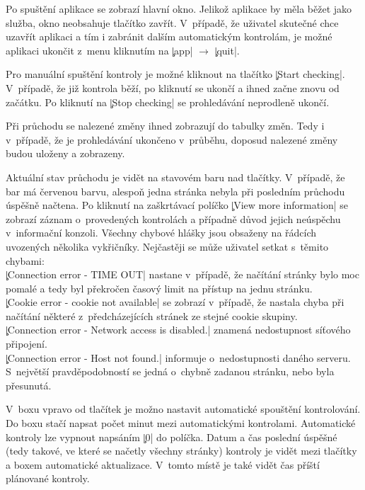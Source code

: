 Po spuštění aplikace se zobrazí hlavní okno.
Jelikož aplikace by měla běžet jako služba, okno neobsahuje tlačítko zavřít.
V~případě, že uživatel skutečné chce uzavřít aplikaci a tím i zabránit dalším automatickým kontrolám, je možné aplikaci ukončit z~menu kliknutím na \c|app| $\rightarrow$ \c|quit|.

Pro manuální spuštění kontroly je možné kliknout na tlačítko \c|Start checking|.
V~případě, že již kontrola běží, po kliknutí se ukončí a ihned začne znovu od začátku.
Po kliknutí na \c|Stop checking| se prohledávání neprodleně ukončí.

Při průchodu se nalezené změny ihned zobrazují do tabulky změn.
Tedy i v~případě, že je prohledávání ukončeno v~průběhu, doposud nalezené změny budou uloženy a zobrazeny.

Aktuální stav průchodu je vidět na stavovém baru  nad tlačítky.
V~případě, že bar má červenou barvu, alespoň jedna stránka nebyla při posledním průchodu úspěšně načtena.
Po kliknutí na zaškrtávací políčko \c|View more information| se zobrazí záznam o~provedených kontrolách a případně důvod jejich neúspěchu v~informační konzoli.
Všechny chybové hlášky jsou obsaženy na řádcích uvozených několika vykřičníky.
Nejčastěji se může uživatel setkat s~těmito chybami:\\
\c|Connection error - TIME OUT| nastane v~případě, že načítání stránky bylo moc pomalé a tedy byl překročen časový limit na přístup na jednu stránku.\\ %
\c|Cookie error - cookie not available| se zobrazí v~případě, že nastala chyba při načítání některé z~předcházejících stránek ze stejné cookie skupiny.\\
\c|Connection error - Network access is disabled.| znamená nedostupnost síťového připojení.\\
\c|Connection error - Host not found.| informuje o~nedostupnosti daného serveru. S~největší pravděpodobností se  jedná o~chybně zadanou stránku, nebo byla přesunutá.

V~boxu vpravo od tlačítek je možno nastavit automatické spouštění kontrolování.
Do boxu stačí napsat počet minut mezi automatickými kontrolami.
Automatické kontroly lze vypnout napsáním \c|0| do políčka.
Datum a čas poslední úspěšné (tedy takové, ve které se načetly všechny stránky) kontroly je vidět mezi tlačítky a boxem automatické aktualizace.
V~tomto místě je také vidět čas příští plánované kontroly.

